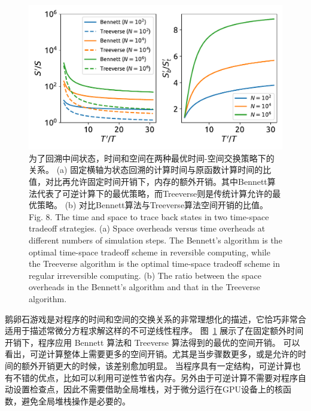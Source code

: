 \documentclass[A4,twoside,UTF8]{ctexart}
\begin{document}
\begin{figure}
\centering
\includegraphics[width=0.8\columnwidth]{./fig1.pdf}
    \caption{为了回溯中间状态，时间和空间在两种最优时间-空间交换策略下的关系。
    (a) 固定横轴为状态回溯的计算时间与原函数计算时间的比值，对比再允许固定时间开销下，内存的额外开销。其中Bennett算法代表了可逆计算下的最优策略，而Treeverse则是传统计算允许的最优策略。
    (b) 对比Bennett算法与Treeverse算法空间开销的比值。\\
    Fig. 8. The time and space to trace back states in two time-space tradeoff strategies.
    (a) Space overheads versus time overheads at different numbers of simulation steps.
    The Bennett's algorithm is the optimal time-space tradeoff scheme in reversible computing, while the Treeverse algorithm is the optimal time-space tradeoff scheme in regular irreversible computing.
    (b) The ratio between the space overheads in the Bennett's algorithm and that in the Treeverse algorithm.
    }\label{fig:timespace}
\end{figure}

鹅卵石游戏是对程序的时间和空间的交换关系的非常理想化的描述，它恰巧非常合适用于描述常微分方程求解这样的不可逆线性程序。
图~\ref{fig:timespace} 展示了在固定额外时间开销下，程序应用 Bennett 算法和 Treeverse 算法得到的最优的空间开销。
可以看出，可逆计算整体上需要更多的空间开销。尤其是当步骤数更多，或是允许的时间的额外开销更大的时候，该差别愈加明显。
当程序具有一定结构，可逆计算也有不错的优点，比如可以利用可逆性节省内存。另外由于可逆计算不需要对程序自动设置检查点，因此不需要借助全局堆栈，对于微分运行在GPU设备上的核函数，避免全局堆栈操作是必要的。


%
%
%
%
%
\end{document}
